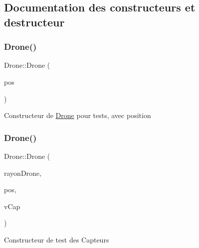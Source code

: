 \subsection{Documentation des constructeurs et destructeur}
\mbox{\label{class_drone_a61e6934c19d51cecd69274b0c2f8f074}} 
\subsubsection{\texorpdfstring{Drone()}{Drone()}\hspace{0.1cm}{\footnotesize\ttfamily [1/3]}}
{\footnotesize\ttfamily Drone\+::\+Drone (\begin{DoxyParamCaption}\item[{const \mbox{\hyperlink{class_vecteur_r3}{Vecteur\+R3}}}]{pos }\end{DoxyParamCaption})}

Constructeur de \mbox{\hyperlink{class_drone}{Drone}} pour tests, avec position \mbox{\label{class_drone_a1065b6a37230163bcd1b463c7a5121f7}} 
\subsubsection{\texorpdfstring{Drone()}{Drone()}\hspace{0.1cm}{\footnotesize\ttfamily [2/3]}}
{\footnotesize\ttfamily Drone\+::\+Drone (\begin{DoxyParamCaption}\item[{const float}]{rayon\+Drone,  }\item[{const \mbox{\hyperlink{class_vecteur_r3}{Vecteur\+R3}}}]{pos,  }\item[{const std\+::vector$<$ \mbox{\hyperlink{class_capteur}{Capteur}} $>$ \&}]{v\+Cap }\end{DoxyParamCaption})}

Constructeur de test des Capteurs \mbox{\label{class_drone_a11bd93fb5dccd88050ca2f89ab45617e}} 
